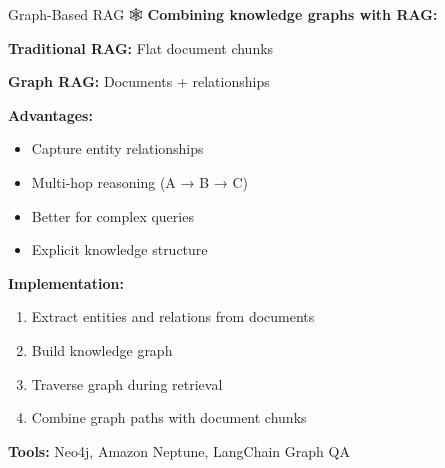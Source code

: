 \documentclass[aspectratio=169]{beamer}
\begin{document}
\begin{frame}[shrink=10]{Graph-Based RAG 🕸️}
\textbf{Combining knowledge graphs with RAG:}

\vspace{0.5em}

\textbf{Traditional RAG:} Flat document chunks

\vspace{0.3em}

\textbf{Graph RAG:} Documents + relationships

\vspace{0.5em}

\textbf{Advantages:}
\begin{itemize}\setlength{\itemsep}{0pt}
    \item Capture entity relationships
    \item Multi-hop reasoning (A → B → C)
    \item Better for complex queries
    \item Explicit knowledge structure
\end{itemize}

\vspace{0.5em}

\textbf{Implementation:}
\begin{enumerate}\setlength{\itemsep}{0pt}
    \item Extract entities and relations from documents
    \item Build knowledge graph
    \item Traverse graph during retrieval
    \item Combine graph paths with document chunks
\end{enumerate}

\vspace{0.5em}

\textbf{Tools:} Neo4j, Amazon Neptune, LangChain Graph QA
\end{frame}
\end{document}
